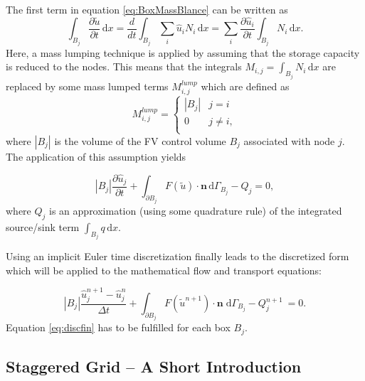 The first term in equation \eqref{eq:BoxMassBlance} can be written as
\begin{equation}
\int_{B_j} \frac{\partial \tilde u}{\partial t} \, \mathrm{d}x = \frac{d}{dt} \int_{B_j} \sum_i \hat u_i N_i  \, \mathrm{d}x = \sum_i \frac{\partial \hat u_i}{\partial t} \int_{B_j}  N_i  \, \mathrm{d}x.
\end{equation}
Here, a mass lumping technique is applied by assuming that the storage capacity is
reduced to the nodes. This means that the integrals $M_{i,j} = \int_{B_j}  N_i \, \mathrm{d}x$
are replaced by some mass lumped terms $M^{lump}_{i,j}$ which are defined as
\begin{equation}
   M^{lump}_{i,j} =\begin{cases}  |B_j| &j = i\\
  0 &j \neq i,\\
           \end{cases}
\end{equation}
where $|B_j|$ is the volume of the FV control volume $B_j$ associated with node $j$.
The application of this assumption yields

\begin{equation}
\label{eq:disc1}
  |B_j| \frac{\partial \hat u_j}{\partial t}
  +  \int_{\partial B_j}  F(\tilde u) \cdot \mathbf n \, \mathrm{d}\Gamma_{B_j} - Q_j = 0,
\end{equation}
where $Q_j$ is an approximation (using some quadrature rule) of the integrated source/sink term $\int_{B_j} q \, \mathrm{d}x$.

Using an implicit Euler time discretization finally
leads to the discretized form which will be applied to the mathematical
flow and transport equations:

\begin{equation}
\label{eq:discfin}
  |B_j| \frac{\hat u_j^{n+1} - \hat u_j^{n}}{\Delta t}
  + \int_{\partial B_j}  F(\tilde u^{n+1}) \cdot \mathbf n
  \;   \mathrm{d}\Gamma_{B_j} - Q_j^{n+1} \: = 0.
\end{equation}
Equation \eqref{eq:discfin} has to be fulfilled for each box $B_j$.
%
\subsection{Staggered Grid -- A Short Introduction}\label{staggered}

